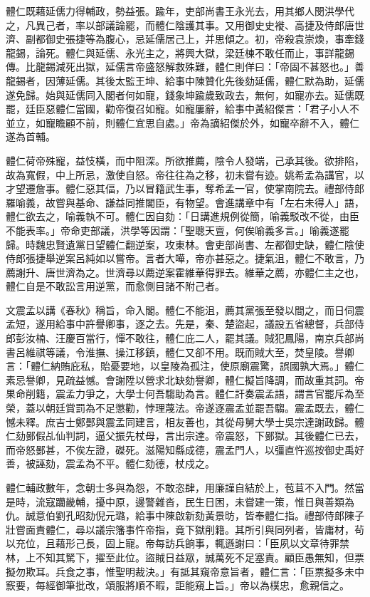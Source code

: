 \begin{pinyinscope}
體仁既藉延儒力得輔政，勢益張。踰年，吏部尚書王永光去，用其鄉人閔洪學代之，凡異己者，率以部議論罷，而體仁陰護其事。又用御史史褷、高捷及侍郎唐世濟、副都御史張捷等為腹心，忌延儒居己上，并思傾之。初，帝殺袁崇煥，事牽錢龍錫，論死。體仁與延儒、永光主之，將興大獄，梁廷棟不敢任而止，事詳龍錫傳。比龍錫減死出獄，延儒言帝盛怒解救殊難，體仁則佯曰：「帝固不甚怒也。」善龍錫者，因薄延儒。其後太監王坤、給事中陳贊化先後劾延儒，體仁默為助，延儒遂免歸。始與延儒同入閣者何如寵，錢象坤踰歲致政去，無何，如寵亦去。延儒既罷，廷臣惡體仁當國，勸帝復召如寵。如寵屢辭，給事中黃紹傑言：「君子小人不並立，如寵瞻顧不前，則體仁宜思自處。」帝為謫紹傑於外，如寵卒辭不入，體仁遂為首輔。

體仁荷帝殊寵，益忮橫，而中阻深。所欲推薦，陰令人發端，己承其後。欲排陷，故為寬假，中上所忌，激使自怒。帝往往為之移，初未嘗有迹。姚希孟為講官，以才望遷詹事。體仁惡其偪，乃以冒籍武生事，奪希孟一官，使掌南院去。禮部侍郎羅喻義，故嘗與基命、謙益同推閣臣，有物望。會進講章中有「左右未得人」語，體仁欲去之，喻義執不可。體仁因自劾：「日講進規例從簡，喻義駁改不從，由臣不能表率。」帝命吏部議，洪學等因謂：「聖聰天亶，何俟喻義多言。」喻義遂罷歸。時魏忠賢遺黨日望體仁翻逆案，攻東林。會吏部尚書、左都御史缺，體仁陰使侍郎張捷舉逆案呂純如以嘗帝。言者大嘩，帝亦甚惡之。捷氣沮，體仁不敢言，乃薦謝升、唐世濟為之。世濟尋以薦逆案霍維華得罪去。維華之薦，亦體仁主之也，體仁自是不敢訟言用逆黨，而愈側目諸不附己者。

文震孟以講《春秋》稱旨，命入閣。體仁不能沮，薦其黨張至發以間之，而日伺震孟短，遂用給事中許譽卿事，逐之去。先是，秦、楚盜起，議設五省總督，兵部侍郎彭汝楠、汪慶百當行，憚不敢往，體仁庇二人，罷其議。賊犯鳳陽，南京兵部尚書呂維祺等議，令淮撫、操江移鎮，體仁又卻不用。既而賊大至，焚皇陵。譽卿言：「體仁納賄庇私，貽憂要地，以皇陵為孤注，使原廟震驚，誤國孰大焉。」體仁素忌譽卿，見疏益憾。會謝陞以營求北缺劾譽卿，體仁擬旨降調，而故重其詞。帝果命削籍，震孟力爭之，大學士何吾騶助為言。體仁訐奏震孟語，謂言官罷斥為至榮，蓋以朝廷賞罰為不足懲勸，悖理蔑法。帝遂逐震孟並罷吾騶。震孟既去，體仁憾未釋。庶吉士鄭鄤與震孟同建言，相友善也，其從母舅大學士吳宗達謝政歸。體仁劾鄤假乩仙判詞，逼父振先杖母，言出宗達。帝震怒，下鄤獄。其後體仁已去，而帝怒鄤甚，不俟左證，磔死。滋陽知縣成德，震孟門人，以彊直忤巡按御史禹好善，被誣劾，震孟為不平。體仁劾德，杖戍之。

體仁輔政數年，念朝士多與為怨，不敢恣肆，用廉謹自結於上，苞苴不入門。然當是時，流寇躪畿輔，擾中原，邊警雜沓，民生日困，未嘗建一策，惟日與善類為仇。誠意伯劉孔昭劾倪元璐，給事中陳啟新劾黃景昉，皆奉體仁指。禮部侍郎陳子壯嘗面責體仁，尋以議宗籓事忤帝指，竟下獄削籍。其所引與同列者，皆庸材，茍以充位，且藉形己長，固上寵。帝每訪兵餉事，輒遜謝曰：「臣夙以文章待罪禁林，上不知其駑下，擢至此位。盜賊日益眾，誠萬死不足塞責。顧臣愚無知，但票擬勿欺耳。兵食之事，惟聖明裁決。」有詆其窺帝意旨者，體仁言：「臣票擬多未中窾要，每經御筆批改，頌服將順不暇，詎能窺上旨。」帝以為樸忠，愈親信之。


\end{pinyinscope}
